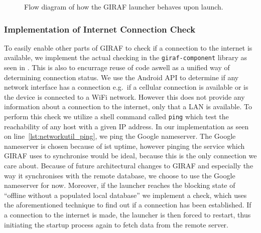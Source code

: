 \begin{figure}[h]
    \centering
    
    \caption{Flow diagram of how the GIRAF launcher behaves upon launch.}\label{fig:launcher_offline_flow}
\end{figure}

\subsubsection{Implementation of Internet Connection Check}
To easily enable other parts of GIRAF to check if a connection to the internet is available, we implement the actual checking in the \texttt{giraf-component} library as seen in .
This is also to encurrage reuse of code aswell as a unified way of determining connection status.
We use the Android API to determine if any network interface has a connection e.g.\ if a cellular connection is available or is the device is connected to a WiFi network.
However this does not provide any information about a connection to the internet, only that a LAN is available.
To perform this check we utilize a shell command called \texttt{ping} which test the reachability of any host with a given IP address.
In our implementation as seen on line~\ref{lst:networkutil_ping}, we ping the Google nameserver.
The Google nameserver is chosen because of ist uptime, however pinging the service which GIRAF uses to synchronise would be ideal, because this is the only connection we care about.
Because of future architectural changes to GIRAF and especially the way it synchronises with the remote database, we choose to use the Google nameserver for now.
Moreover, if the launcher reaches the blocking state of \enquote{offline without a populated local database} we implement a check, which uses the aforementioned technique to find out if a connection has been established.
If a connection to the internet is made, the launcher is then forced to restart, thus initiating the startup process again to fetch data from the remote server.


